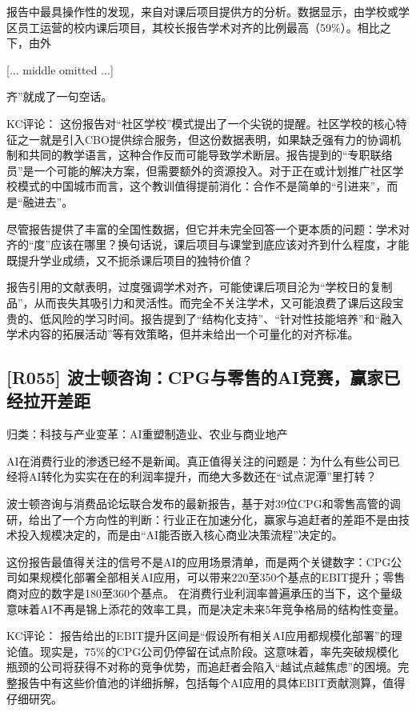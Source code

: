 \documentclass[11pt]{ctexart}
\begin{document}
报告中最具操作性的发现，来自对课后项目提供方的分析。数据显示，由学校或学区员工运营的校内课后项目，其校长报告学术对齐的比例最高（59\%）。相比之下，由外

[... middle omitted ...]

齐”就成了一句空话。

KC评论： 这份报告对“社区学校”模式提出了一个尖锐的提醒。社区学校的核心特征之一就是引入CBO提供综合服务，但这份数据表明，如果缺乏强有力的协调机制和共同的教学语言，这种合作反而可能导致学术断层。报告提到的“专职联络员”是一个可能的解决方案，但需要额外的资源投入。对于正在或计划推广社区学校模式的中国城市而言，这个教训值得提前消化：合作不是简单的“引进来”，而是“融进去”。

尽管报告提供了丰富的全国性数据，但它并未完全回答一个更本质的问题：学术对齐的“度”应该在哪里？换句话说，课后项目与课堂到底应该对齐到什么程度，才能既提升学业成绩，又不扼杀课后项目的独特价值？

报告引用的文献表明，过度强调学术对齐，可能使课后项目沦为“学校日的复制品”，从而丧失其吸引力和灵活性。而完全不关注学术，又可能浪费了课后这段宝贵的、低风险的学习时间。报告提到了“结构化支持”、“针对性技能培养”和“融入学术内容的拓展活动”等有效策略，但并未给出一个可量化的对齐标准。

\subsection{[R055] 波士顿咨询：CPG与零售的AI竞赛，赢家已经拉开差距}
{\small\color{refgray}归类：科技与产业变革：AI重塑制造业、农业与商业地产}

AI在消费行业的渗透已经不是新闻。真正值得关注的问题是：为什么有些公司已经将AI转化为实实在在的利润率提升，而绝大多数还在“试点泥潭”里打转？

波士顿咨询与消费品论坛联合发布的最新报告，基于对39位CPG和零售高管的调研，给出了一个方向性的判断：行业正在加速分化，赢家与追赶者的差距不是由技术投入规模决定的，而是由“AI能否嵌入核心商业决策流程”决定的。

这份报告最值得关注的信号不是AI的应用场景清单，而是两个关键数字：CPG公司如果规模化部署全部相关AI应用，可以带来220至350个基点的EBIT提升；零售商对应的数字是180至360个基点。 在消费行业利润率普遍承压的当下，这个量级意味着AI不再是锦上添花的效率工具，而是决定未来5年竞争格局的结构性变量。

KC评论： 报告给出的EBIT提升区间是“假设所有相关AI应用都规模化部署”的理论值。现实是，75\%的CPG公司仍停留在试点阶段。这意味着，率先突破规模化瓶颈的公司将获得不对称的竞争优势，而追赶者会陷入“越试点越焦虑”的困境。完整报告中有这些价值池的详细拆解，包括每个AI应用的具体EBIT贡献测算，值得仔细研究。
\end{document}
